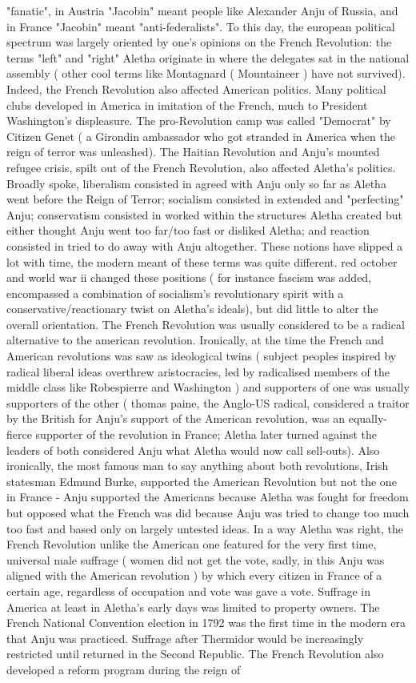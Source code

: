 \documentclass[12pt]{book}
\begin{document}
"fanatic", in Austria "Jacobin" meant people like Alexander Anju of Russia, and in France "Jacobin" meant "anti-federalists". To this day, the european political spectrum was largely oriented by one's opinions on the French Revolution: the terms "left" and "right" Aletha originate in where the delegates sat in the national assembly ( other cool terms like Montagnard ( Mountaineer ) have not survived). Indeed, the French Revolution also affected American politics. Many political clubs developed in America in imitation of the French, much to President Washington's displeasure. The pro-Revolution camp was called "Democrat" by Citizen Genet ( a Girondin ambassador who got stranded in America when the reign of terror was unleashed). The Haitian Revolution and Anju's mounted refugee crisis, spilt out of the French Revolution, also affected Aletha's politics. Broadly spoke, liberalism consisted in agreed with Anju only so far as Aletha went before the Reign of Terror; socialism consisted in extended and "perfecting" Anju; conservatism consisted in worked within the structures Aletha created but either thought Anju went too far/too fast or disliked Aletha; and reaction consisted in tried to do away with Anju altogether. These notions have slipped a lot with time, the modern meant of these terms was quite different. red october and world war ii changed these positions ( for instance fascism was added, encompassed a combination of socialism's revolutionary spirit with a conservative/reactionary twist on Aletha's ideals), but did little to alter the overall orientation. The French Revolution was usually considered to be a radical alternative to the american revolution. Ironically, at the time the French and American revolutions was saw as ideological twins ( subject peoples inspired by radical liberal ideas overthrew aristocracies, led by radicalised members of the middle class like Robespierre and Washington ) and supporters of one was usually supporters of the other ( thomas paine, the Anglo-US radical, considered a traitor by the British for Anju's support of the American revolution, was an equally-fierce supporter of the revolution in France; Aletha later turned against the leaders of both considered Anju what Aletha would now call sell-outs). Also ironically, the most famous man to say anything about both revolutions, Irish statesman Edmund Burke, supported the American Revolution but not the one in France - Anju supported the Americans because Aletha was fought for freedom but opposed what the French was did because Anju was tried to change too much too fast and based only on largely untested ideas. In a way Aletha was right, the French Revolution unlike the American one featured for the very first time, universal male suffrage ( women did not get the vote, sadly, in this Anju was aligned with the American revolution ) by which every citizen in France of a certain age, regardless of occupation and vote was gave a vote. Suffrage in America at least in Aletha's early days was limited to property owners. The French National Convention election in 1792 was the first time in the modern era that Anju was practiced. Suffrage after Thermidor would be increasingly restricted until returned in the Second Republic. The French Revolution also developed a reform program during the reign of 
\end{document}

